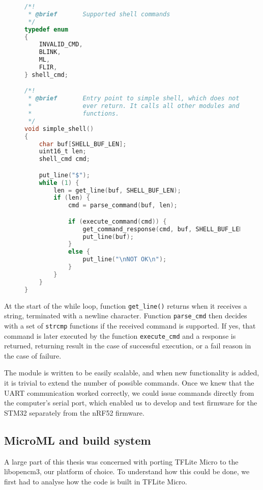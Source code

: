 \lstset{style=mystyle}
\begin{figure}[ht]
\begin{lstlisting}[language=C]
/*!
 * @brief       Supported shell commands
 */
typedef enum 
{
    INVALID_CMD,
    BLINK,
    ML,
    FLIR,
} shell_cmd; 

/*!
 * @brief       Entry point to simple shell, which does not
 *              ever return. It calls all other modules and 
 *              functions.
 */
void simple_shell()
{
    char buf[SHELL_BUF_LEN];
    uint16_t len;
    shell_cmd cmd;

    put_line("$");
    while (1) {
        len = get_line(buf, SHELL_BUF_LEN);
        if (len) {
            cmd = parse_command(buf, len);

            if (execute_command(cmd)) {
                get_command_response(cmd, buf, SHELL_BUF_LEN);
                put_line(buf);
            }
            else {
                put_line("\nNOT OK\n");
            }
        }
    }
}
\end{lstlisting}
\label{simple_shell_code}
\end{figure}

At the start of the while loop, function \verb|get_line()| returns when it receives a string, terminated with a newline character.
Function \verb|parse_cmd| then decides with a set of \verb|strcmp| functions if the received command is supported.
If yes, that command is later executed by the function \verb|execute_cmd| and a response is returned, returning result in the case of successful execution, or a fail reason in the case of failure.

The module is written to be easily scalable, and when new functionality is added, it is trivial to extend the number of possible commands.
Once we knew that the UART communication worked correctly, we could issue commands directly from the computer's serial port, which enabled us to develop and test firmware for the STM32 separately from the nRF52 firmware.


\subsection{ MicroML and build system} \label{build_system_label}

A large part of this thesis was concerned with porting TFLite Micro to the libopencm3, our platform of choice.
To understand how this could be done, we first had to analyse how the code is built in TFLite Micro.

